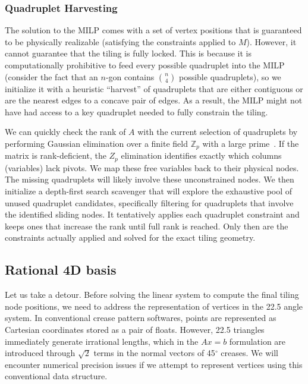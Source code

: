 \documentclass[11pt]{article}
\begin{document}
\subsubsection{Quadruplet Harvesting}

The solution to the MILP comes with a set of vertex positions that is guaranteed to be physically realizable (satisfying the constraints applied to $M$). However, it cannot guarantee that the tiling is fully locked. This is because it is computationally prohibitive to feed every possible quadruplet into the MILP (consider the fact that an $n$-gon contains $\binom{n}{4}$ possible quadruplets), so we initialize it with a heuristic ``harvest'' of quadruplets that are either contiguous or are the nearest edges to a concave pair of edges. As a result, the MILP might not have had access to a key quadruplet needed to fully constrain the tiling.

We can quickly check the rank of $A$ with the current selection of quadruplets by performing Gaussian elimination over a finite field $\mathbb{Z}_p$ with a large prime~\cite{rankcheck}. If the matrix is rank-deficient, the $Z_p$ elimination identifies exactly which columns (variables) lack pivots. We map these free variables back to their physical nodes. The missing quadruplets will likely involve these unconstrained nodes. We then initialize a depth-first search scavenger that will explore the exhaustive pool of unused quadruplet candidates, specifically filtering for quadruplets that involve the identified sliding nodes. It tentatively applies each quadruplet constraint and keeps ones that increase the rank until full rank is reached. Only then are the constraints actually applied and solved for the exact tiling geometry. 


\subsection{Rational 4D basis}\label{sec:4D}

Let us take a detour. Before solving the linear system to compute the final tiling node positions, we need to address the representation of vertices in the 22.5 angle system. In conventional crease pattern softwares, points are represented as Cartesian coordinates stored as a pair of floats. However, 22.5 triangles immediately generate irrational lengths, which in the $Ax=b$ formulation are introduced through $\sqrt{2}$ terms in the normal vectors of 45$^\circ$ creases. We will encounter numerical precision issues if we attempt to represent vertices using this conventional data structure. 
\end{document}
